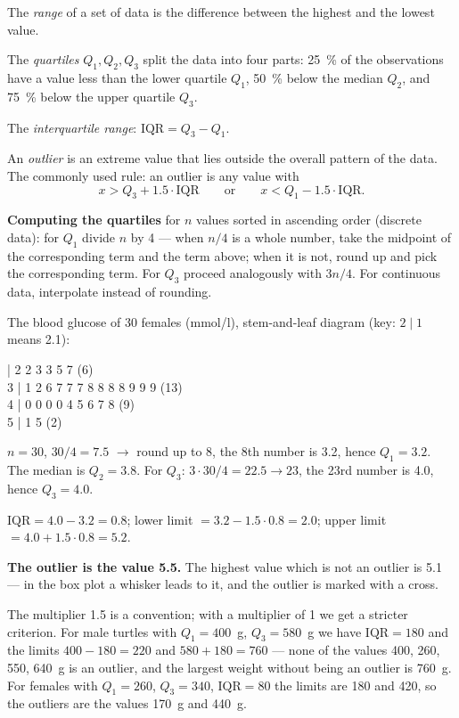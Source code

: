 \documentclass[11pt,a4paper]{article}
\theoremstyle{definition}
\begin{document}
\begin{defbox}
The \emph{range} of a set of data is the difference between the highest and the lowest value.

The \emph{quartiles} $Q_1,Q_2,Q_3$ split the data into four parts: 25~\% of the observations
have a value less than the lower quartile $Q_1$, 50~\% below the median $Q_2$, and 75~\% below
the upper quartile $Q_3$.

The \emph{interquartile range}: $\mathrm{IQR}=Q_3-Q_1$.

An \emph{outlier} is an extreme value that lies outside the overall pattern of the data. The
commonly used rule: an outlier is any value with
\[ x > Q_3 + 1.5\cdot \mathrm{IQR} \qquad\text{or}\qquad x < Q_1 - 1.5\cdot \mathrm{IQR}. \]
\end{defbox}

\textbf{Computing the quartiles} for $n$ values sorted in ascending order (discrete data): for
$Q_1$ divide $n$ by 4 --- when $n/4$ is a whole number, take the midpoint of the corresponding
term and the term above; when it is not, round up and pick the corresponding term. For $Q_3$
proceed analogously with $3n/4$. For continuous data, interpolate instead of rounding.

\begin{defbox}
The blood glucose of 30 females (mmol/l), stem-and-leaf diagram (key: $2\mid 1$ means 2.1):
\begin{center} | 2 2 3 3 5 7 \hfill (6)\\
3 | 1 2 6 7 7 7 8 8 8 8 9 9 9 \hfill (13)\\
4 | 0 0 0 0 4 5 6 7 8 \hfill (9)\\
5 | 1 5 \hfill (2)
\end{center}
$n=30$, $30/4=7.5$ $\to$ round up to 8, the 8th number is 3.2, hence $Q_1=3.2$. The median is
$Q_2=3.8$. For $Q_3$: $3\cdot 30/4=22.5\to 23$, the 23rd number is 4.0, hence $Q_3=4.0$.

$\mathrm{IQR}=4.0-3.2=0.8$; lower limit $=3.2-1.5\cdot 0.8=2.0$; upper limit
$=4.0+1.5\cdot 0.8=5.2$.

\textbf{The outlier is the value 5.5.} The highest value which is not an outlier is 5.1 --- in
the box plot a whisker leads to it, and the outlier is marked with a cross.
\end{defbox}

The multiplier 1.5 is a convention; with a multiplier of 1 we get a stricter criterion. For male
turtles with $Q_1=400$~g, $Q_3=580$~g we have $\mathrm{IQR}=180$ and the limits
$400-180=220$ and $580+180=760$ --- none of the values 400, 260, 550, 640~g is an outlier, and
the largest weight without being an outlier is 760~g. For females with $Q_1=260$, $Q_3=340$,
$\mathrm{IQR}=80$ the limits are 180 and 420, so the outliers are the values 170~g and 440~g.
\end{document}
